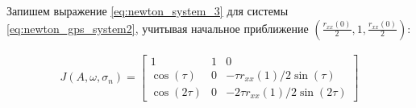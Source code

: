 Запишем выражение \ref{eq:newton_system_3} для системы \ref{eq:newton_gps_system2}, учитывая начальное
приближение ${(\frac{r_{xx}(0)}{2}, 1, \frac{r_{xx}(0)}{2})}$:
\begin{center}
\begin{eqnarray}
	\label{eq:newton_system_3}
	J(A, \omega, \sigma_n) = 
		\left[ \begin{array}{ccc}
		1 & 1 & 0 \\
		\cos(\tau) & 0 & - \tau r_{xx}(1)/2 \sin(\tau) \\
		\cos(2\tau) & 0 & -2 \tau r_{xx}(1)/2 \sin(2 \tau)
		\end{array} \right]
\end{eqnarray}
\end{center}
\newpage
